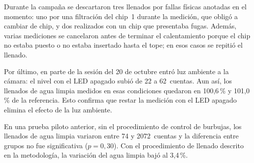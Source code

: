 Durante la campaña se descartaron tres llenados por fallas físicas anotadas en el
momento: uno por una filtración del chip~1 durante la medición, que obligó a cambiar
de chip, y dos realizados con un chip que presentaba fugas. Además, varias
mediciones se cancelaron antes de terminar el calentamiento porque el chip no estaba
puesto o no estaba insertado hasta el tope; en esos casos se repitió el llenado.

Por último, en parte de la sesión del 20 de octubre entró luz ambiente a la cámara:
el nivel con el LED apagado subió de 22 a 62~cuentas. Aun así, los llenados de agua
limpia medidos en esas condiciones quedaron en 100,6\,\% y 101,0\,\% de la
referencia. Esto confirma que restar la medición con el LED apagado elimina el efecto
de la luz ambiente.

En una prueba piloto anterior, sin el procedimiento de control de burbujas, los
llenados de agua limpia variaron entre 74 y 2072~cuentas y la diferencia entre
grupos no fue significativa ($p = 0{,}30$). Con el procedimiento de llenado descrito
en la metodología, la variación del agua limpia bajó al 3,4\,\%.



